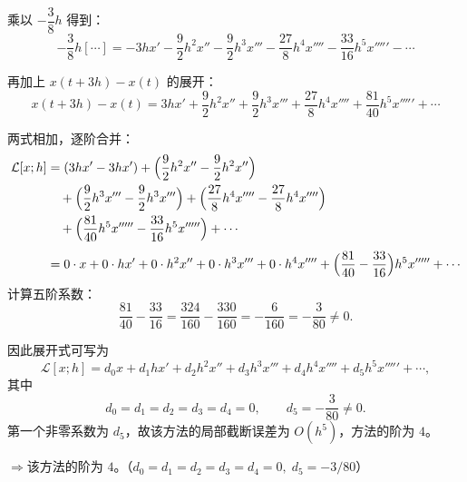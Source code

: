\documentclass{article}
\begin{document}
乘以 $-\dfrac{3}{8}h$ 得到：
\[
-\frac{3}{8}h[\cdots] = -3h x' - \frac{9}{2}h^2 x'' - \frac{9}{2}h^3 x''' - \frac{27}{8}h^4 x'''' - \frac{33}{16}h^5 x''''' - \cdots
\]

再加上 $x(t+3h) - x(t)$ 的展开：
\[
x(t+3h) - x(t) = 3h x' + \frac{9}{2}h^2 x'' + \frac{9}{2}h^3 x''' + \frac{27}{8}h^4 x'''' + \frac{81}{40}h^5 x''''' + \cdots
\]

两式相加，逐阶合并：
\begin{align*}
\mathcal{L}[x; h] 
&= (3h x' - 3h x') 
   + \Bigl(\frac{9}{2}h^2 x'' - \frac{9}{2}h^2 x''\Bigr) \\
&\quad + \Bigl(\frac{9}{2}h^3 x''' - \frac{9}{2}h^3 x'''\Bigr)
   + \Bigl(\frac{27}{8}h^4 x'''' - \frac{27}{8}h^4 x''''\Bigr) \\
&\quad + \Bigl(\frac{81}{40}h^5 x''''' - \frac{33}{16}h^5 x'''''\Bigr) + \cdots\\[4pt]
&= 0 \cdot x + 0 \cdot h x' + 0 \cdot h^2 x'' + 0 \cdot h^3 x''' + 0 \cdot h^4 x''''
   + \Bigl(\frac{81}{40} - \frac{33}{16}\Bigr)h^5 x''''' + \cdots
\end{align*}
计算五阶系数：
\[
\frac{81}{40} - \frac{33}{16} = \frac{324}{160} - \frac{330}{160} = -\frac{6}{160} = -\frac{3}{80} \neq 0.
\]

因此展开式可写为
\[
\mathcal{L}[x; h] = d_0 x + d_1 h x' + d_2 h^2 x'' + d_3 h^3 x''' + d_4 h^4 x'''' + d_5 h^5 x''''' + \cdots,
\]
其中
\[
d_0 = d_1 = d_2 = d_3 = d_4 = 0, \qquad d_5 = -\frac{3}{80} \neq 0.
\]
第一个非零系数为 $d_5$，故该方法的局部截断误差为 $O(h^5)$，方法的阶为 $4$。

$\Rightarrow$该方法的阶为 $4$。（$d_0 = d_1 = d_2 = d_3 = d_4 = 0,\; d_5 = -3/80$）
\end{document}

